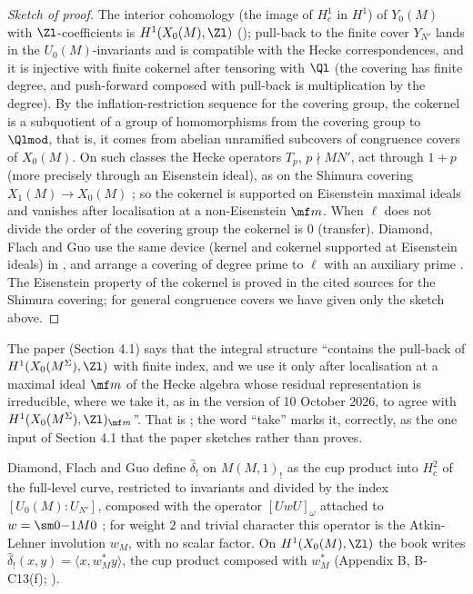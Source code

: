 \begin{proof}[Sketch of proof]
The interior cohomology (the image of $H^1_c$ in $H^1$) of $Y_0(M)$ with $\Zl$-coefficients is $H^1(X_0(M),\Zl)$ (); pull-back to the finite cover $Y_{N'}$ lands in the
$U_0(M)$-invariants and is compatible with the Hecke correspondences, and it is injective with finite cokernel after tensoring with $\Ql$ (the covering has finite degree, and
push-forward composed with pull-back is multiplication by the degree). By the inflation-restriction sequence for the covering group, the cokernel is a subquotient of a
group of homomorphisms from the covering group to $\Qlmod$, that is, it comes from abelian unramified subcovers of congruence covers of $X_0(M)$. On such classes the
Hecke operators $T_p$, $p\nmid MN'$, act through $1+p$ (more precisely through an Eisenstein ideal), as on the Shimura covering $X_1(M)\to X_0(M)$
\cite{LingOesterle,Ribet88}; so the cokernel is supported on Eisenstein maximal ideals and vanishes after localisation at a non-Eisenstein $\mf m$. When $\ell$ does not divide
the order of the covering group the cokernel is $0$ (transfer). Diamond, Flach and Guo use the same device (kernel and cokernel supported at Eisenstein ideals) in
\cite[Lemma 1.8, Corollary 1.9]{DFG04}, and arrange a covering of degree prime to $\ell$ with an auxiliary prime \cite[Section 1.8]{DFG04}. The Eisenstein property of the cokernel
is proved in the cited sources for the Shimura covering; for general congruence covers we have given only the sketch above.
\end{proof}

\begin{paperlink}
The paper (Section 4.1) says that the integral structure ``contains the pull-back of $H^1(X_0(M^\Sigma),\Zl)$ with finite index, and we use it only after localisation at a maximal ideal
$\mf m$ of the Hecke algebra whose residual representation is irreducible, where we take it, as in the version of 10 October 2026, to agree with $H^1(X_0(M^\Sigma),\Zl)_{\mf m}$''. That
is ; the word ``take'' marks it, correctly, as the one input of Section 4.1 that the paper sketches rather than proves.
\end{paperlink}

\begin{definition}\label{def:congruence:dfg-pairing}
Diamond, Flach and Guo define $\hat\delta_!$ on $M(M,1)_!$ as the cup product into $H^2_c$ of the full-level curve, restricted to invariants and divided by the index $[U_0(M):U_{N'}]$, composed
with the operator $[UwU]_\omega$ attached to $w=\sm0{-1}M0$ \cite[Sections 1.5.2, 1.5.3, (13), (14)]{DFG04}; for weight $2$ and trivial character this operator is the Atkin-Lehner
involution $w_M$, with no scalar factor. On $H^1(X_0(M),\Zl)$ the book writes $\hat\delta_!(x,y)=\langle x,w_M^*y\rangle$, the cup product composed with $w_M^*$ (Appendix B, B-C13(f);
).
\end{definition}

